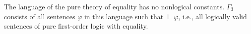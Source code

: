 The language of the pure theory of equality has no nonlogical constants. $\Gamma_3$ consists of all sentences $\varphi$ in this language such that $\vdash \varphi$, i.e., all logically valid sentences of pure first-order logic with equality.
